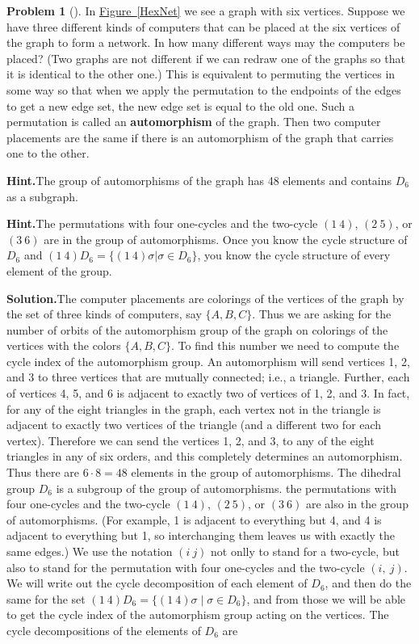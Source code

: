 \documentclass[10pt,]{book}
\newcommand{\terminology}[1]{\textbf{#1}}
\theoremstyle{plain}
\theoremstyle{definition}
\newtheorem{activity}[project]{Problem}
\theoremstyle{definition}
\numberwithin{equation}{chapter}
\begin{document}
\begin{activity}[]\label{activity-326}
In \hyperref[HexNet]{Figure~\ref{HexNet}} we see a graph with six vertices. Suppose we have three different kinds of computers that can be placed at the six vertices of the graph to form a network. In how many different ways may the computers be placed? (Two graphs are not different if we can redraw one of the graphs so that it is identical to the other one.) This is equivalent to permuting the vertices in some way so that when we apply the permutation to the endpoints of the edges to get a new edge set, the new edge set is equal to the old one. Such a permutation is called an \terminology{automorphism} of the graph. Then two computer placements are the same if there is an automorphism of the graph that carries one to the other.%
\par\medskip\noindent%
\textbf{Hint.}\quad The group of automorphisms of the graph has 48 elements and contains \(D_6\) as a subgraph.%
\par\medskip\noindent%
\textbf{Hint.}\quad The permutations with four one-cycles and the two-cycle \((1\ 4)\), \((2\ 5)\), or \((3\ 6)\) are in the group of automorphisms. Once you know the cycle structure of \(D_6\) and \((1\ 4)D_6 = \{(1\ 4)\sigma | \sigma \in D_6\}\), you know the cycle structure of every element of the group.%
\par\medskip\noindent%
\textbf{Solution.}\quad The computer placements are colorings of the vertices of the graph by the set of three kinds of computers, say \(\{A,B,C\}\). Thus we are asking for the number of orbits of the automorphism group of the graph on colorings of the vertices with the colors \(\{A, B,
C\}\). To find this number we need to compute the cycle index of the automorphism group. An automorphism will send vertices 1, 2, and 3 to three vertices that are mutually connected; i.e.\@, a triangle. Further, each of vertices 4, 5, and 6 is adjacent to exactly two of vertices of 1, 2, and 3. In fact, for any of the eight triangles in the graph, each vertex not in the triangle is adjacent to exactly two vertices of the triangle (and a different two for each vertex). Therefore we can send the vertices 1, 2, and 3, to any of the eight triangles in any of six orders, and this completely determines an automorphism. Thus there are \(6\cdot8=48\) elements in the group of automorphisms. The dihedral group \(D_6\) is a subgroup of the group of automorphisms. the permutations with four one-cycles and the two-cycle \((1\ 4)\), \((2\ 5)\), or \((3\ 6)\) are also in the group of automorphisms. (For example, 1 is adjacent to everything but 4, and 4 is adjacent to everything but 1, so interchanging them leaves us with exactly the same edges.) We use the notation \((i\ j)\) not onlly to stand for a two-cycle, but also to stand for the permutation with four one-cycles and the two-cycle \((i,\ j)\). We will write out the cycle decomposition of each element of \(D_6\), and then do the same for the set \((1\ 4)D_6 = \{(1\ 4)\sigma\mid \sigma\in D_6\}\), and from those we will be able to get the cycle index of the automorphism group acting on the vertices. The cycle decompositions of the elements of \(D_6\) are%

\end{activity}
\end{document}
